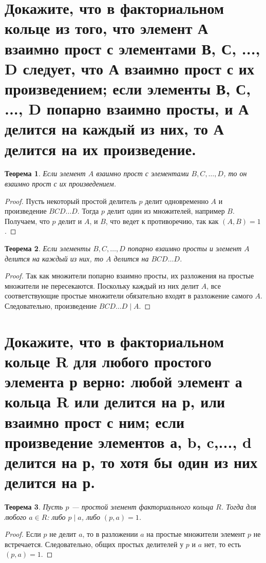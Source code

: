 \documentclass[12pt, a4paper]{article}
\theoremstyle{definition}
\theoremstyle{plain}
\newtheorem{theorem}{Теорема}[section]
\begin{document}
	\newpage
	\setcounter{section}{30}
	
	\section{Докажите, что в факториальном кольце из того, что элемент А взаимно прост с элементами В, С, ..., D следует, что А взаимно прост с их произведением; если элементы В, С, ..., D попарно взаимно просты, и А делится на каждый из них, то А делится на их произведение.}
	
	\begin{theorem}
		Если элемент $A$ взаимно прост с элементами $B, C, \dots, D$, то он взаимно прост с их произведением.
	\end{theorem}
	\begin{proof}
		Пусть некоторый простой делитель $p$ делит одновременно $A$ и произведение $BCD\dots D$. Тогда $p$ делит один из множителей, например $B$. Получаем, что $p$ делит и $A$, и $B$, что ведет к противоречию, так как $(A,B)=1$.
	\end{proof}
	
	\begin{theorem}
		Если элементы $B, C, \dots, D$ попарно взаимно просты и элемент $A$ делится на каждый из них, то $A$ делится на $BCD\dots D$.
	\end{theorem}
	\begin{proof}
		Так как множители попарно взаимно просты, их разложения на простые множители не пересекаются. Поскольку каждый из них делит $A$, все соответствующие простые множители обязательно входят в разложение самого $A$. Следовательно, произведение $BCD\dots D \mid A$.
	\end{proof}
	
	\newpage
	\section{Докажите, что в факториальном кольце R для любого простого элемента р верно: любой элемент а кольца R или делится на р, или взаимно прост с ним; если произведение элементов а, b, c,..., d делится на р, то хотя бы один из них делится на р.}
	
	\begin{theorem}
		Пусть $p$ — простой элемент факториального кольца $R$. Тогда для любого $a \in R$: либо $p \mid a$, либо $(p,a)=1$.
	\end{theorem}
	\begin{proof}
		Если $p$ не делит $a$, то в разложении $a$ на простые множители элемент $p$ не встречается. Следовательно, общих простых делителей у $p$ и $a$ нет, то есть $(p,a)=1$.
	\end{proof}
	
\end{document}

